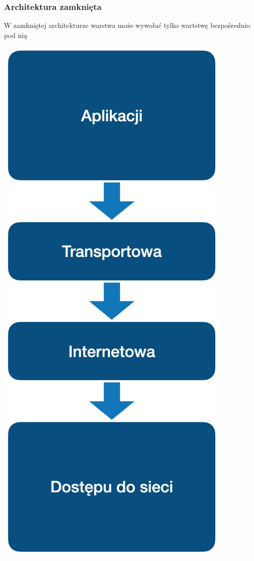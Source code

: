 \documentclass[12pt]{article}
\begin{document}
            \subsubsection{Architektura zamknięta}

            W zamkniętej architekturze warstwa może wywołać tylko wartstwę
            bezpośrednio pod nią

            \begin{center}
                \includegraphics[scale=0.30]{patterns/tcp.png}
            \end{center}
\end{document}
